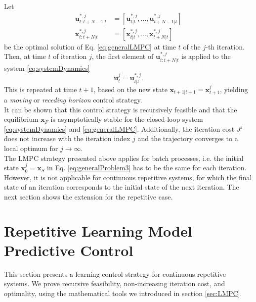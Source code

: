 Let
\begin{align}
\bm{u}_{t:t+N-1|t}^{*,j}&=[\bm{u}_{t|t}^{*,j},...,\bm{u}_{t+N-1|t}^{*,j}]\\
\bm{x}_{t:t+N|t}^{*,j}&=[\bm{x}_{t|t}^{*,j},...,\bm{x}_{t+N|t}^{*,j}]
\end{align}
be the optimal solution of Eq. \eqref{eq:generalLMPC} at time $t$ of the $j$-th iteration. Then, at time $t$ of iteration $j$, the first element of $\bm{u}_{t:t+N|t}^{*,j}$ is applied to the system \eqref{eq:systemDynamics}
\begin{equation}\label{eq:recHorizon}
\bm{u}_t^j = \bm{u}_{t|t}^{*,j}.
\end{equation}
This is repeated at time $t+1$, based on the new state $\bm{x}_{t+1|t+1}=\bm{x}_{t+1}^j$, yielding a \emph{moving} or \emph{receding horizon} control strategy.\\
It can be shown that this control strategy is recursively feasible and that the equilibrium $\bm{x}_F$ is asymptotically stable for the closed-loop  system \eqref{eq:systemDynamics} and \eqref{eq:generalLMPC}. Additionally, the iteration cost $J^j$ does not increase with the iteration index $j$ and the trajectory converges to a local optimum for $j\rightarrow\infty$.\\
The LMPC strategy presented above applies for batch processes, i.e. the initial state $\bm{x}_0^j=\bm{x}_S$ in Eq. \eqref{eq:generalProblem3} has to be the same for each iteration. However, it is not applicable for continuous repetitive systems, for which the final state of an iteration corresponds to the initial state of the next iteration. The next section shows the extension for the repetitive case.

\section{Repetitive Learning Model Predictive Control}
This section presents a learning control strategy for continuous repetitive systems. We prove recursive feasibility, non-increasing iteration cost, and optimality, using the mathematical tools we introduced in section \ref{sec:LMPC}.\\

